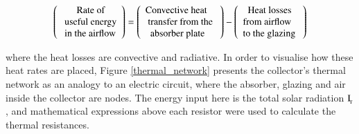 \begin{equation*}
	\left( \begin{array}{l}
		{\rm{\ \ \ \ \ \ Rate \ of}}\\
		{\rm{\ useful \ energy }}\\
		{\rm{\ in \ the \ airflow}}
	\end{array} \right) = \left( \begin{array}{l}
		{\rm{Convective \ heat}}\\
		{\rm{\ transfer \ from \ the \ }}\\
		{\rm{\ \ absorber \ plate}}
	\end{array} \right) - \left( \begin{array}{l}
		{\rm{\ \ Heat \ losses}}\\
		{\rm{from \ airflow \ }} \\
		{\rm{to \ the \ glazing \ }}
	\end{array} \right) 
	\label{text_equation_air}
\end{equation*}



\noindent where the heat losses are convective and radiative. In order to visualise how these heat rates are placed, Figure \ref{thermal_network} presents the collector's thermal network as an analogy to an electric circuit, where the absorber, glazing and air inside the collector are nodes. The energy input here is the total solar radiation $\rm{I_{\!_{T}}}$, and mathematical expressions above each resistor were used to calculate the thermal resistances.


